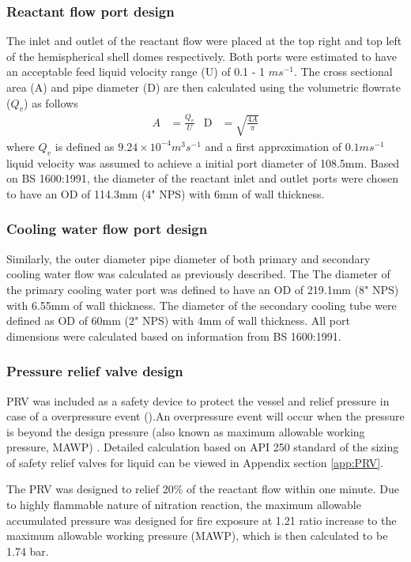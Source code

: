 \subsubsection{Reactant flow port design}
The inlet and outlet of the reactant flow were placed at the top right and top left of the hemispherical shell domes respectively. Both ports were estimated to have an acceptable feed liquid velocity range (U) of 0.1 - 1 $ms^{-1}$. The cross sectional area (A) and pipe diameter (D) are then calculated using the volumetric flowrate ($Q_v$) as follows
\begin{align}
    A &= \frac{Q_v}{U} &
    \mathrm{D} &= \sqrt{\frac{4A}{\pi}}
\end{align}
where $Q_v$ is defined as $9.24 \times 10^{-4} m^3s^{-1}$ and a first approximation of $0.1 ms^{-1}$ liquid velocity was assumed to achieve a initial port diameter of 108.5mm. Based on BS 1600:1991, the diameter of the reactant inlet and outlet ports were chosen to have an OD of 114.3mm (4" NPS) with 6mm of wall thickness. 

\subsubsection{Cooling water flow port design}
Similarly, the outer diameter pipe diameter of both primary and secondary cooling water flow was calculated as previously described. The 
The diameter of the primary cooling water port was defined to have an OD of 219.1mm (8" NPS) with 6.55mm of wall thickness. The diameter of the secondary cooling tube were defined as OD of 60mm (2" NPS) with 4mm of wall thickness. All port dimensions were calculated based on information from BS 1600:1991. 


\subsubsection{Pressure relief valve design}
PRV was included as a safety device to protect the vessel and relief pressure in case of a overpressure event ().An overpressure event will occur when the pressure is beyond the design pressure (also known as maximum allowable working pressure, MAWP) \cite{marsha_lecture_nodate}. Detailed calculation based on API 250 standard \cite{api_standard_520_sizing_2013} of the sizing of safety relief valves for liquid can be viewed in Appendix section \ref{app:PRV}.

The PRV was designed to relief 20\% of the reactant flow within one minute. Due to highly flammable nature of nitration reaction, the maximum allowable accumulated pressure was designed for fire exposure at 1.21 ratio increase to the maximum allowable working pressure (MAWP), which is then calculated to be 1.74 bar. 

